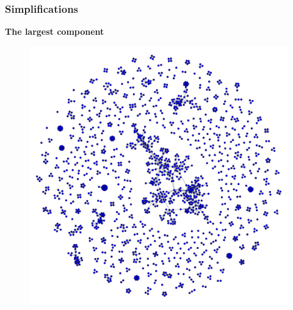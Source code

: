\documentclass{beamer}
\begin{document}
\begin{frame}
    \frametitle{Simplifications}
    \centering
    {\Large \bf The largest component}
    \begin{figure}
        \includegraphics[width=0.7\columnwidth]{netscience.pdf}
    \end{figure}
\end{frame}
\end{document}
